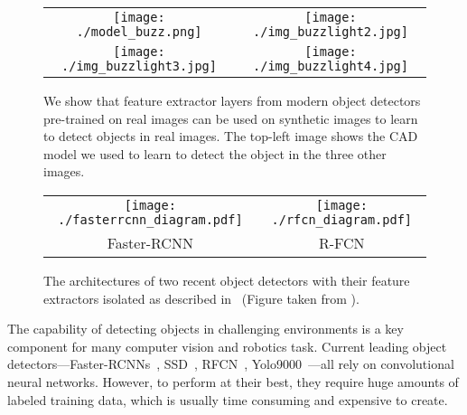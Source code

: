 \documentclass[10pt,twocolumn,letterpaper]{article}
\newcommand{\comment}[1]{}
\newcommand{\imgspace}[0]{\hspace{-0.3cm}}
\begin{document}
\begin{figure}[ht]
\begin{center}
\begin{tabular}{cc}
\texttt{[image: ./model\_buzz.png]} & \imgspace
\texttt{[image: ./img\_buzzlight2.jpg]} \\
\texttt{[image: ./img\_buzzlight3.jpg]} & \imgspace
\texttt{[image: ./img\_buzzlight4.jpg]} \\
\end{tabular}
\end{center}
\caption{\label{fig:overview}
We show that feature extractor layers from modern object detectors pre-trained on real images 
can be used on synthetic images to learn to detect objects
in real images. The top-left image shows the CAD model we used to
learn to detect the object in the three other images. }
\comment{
In this  paper,  we show  how a  simple
  trick enables  learning deep object detectors  purely from synthetic
  data.  In the  upper left image we  see one of the 3D  CAD models we
  learn from and  the remaining images show the  object detected under
  various  poses in  a heavily  cluttered environments.  We achieve  a
  detection performance  up to  $95\%$ of a  detector trained  on real
  data.}
\end{figure}

\begin{figure*}[ht]
\begin{center}
\begin{tabular}{cc}
\texttt{[image: ./fasterrcnn\_diagram.pdf]} &
\texttt{[image: ./rfcn\_diagram.pdf]} \\
Faster-RCNN &
R-FCN \\
\end{tabular}
\end{center}
\caption{\label{fig:metaarchitecture} The architectures of two recent object
  detectors with their feature extractors isolated as described
  in~\cite{Huang17} (Figure taken from \cite{Huang17}).}
\end{figure*}

 
The  capability  of detecting  objects  in  challenging  environments is  a  key
component for  many computer vision  and robotics task.  Current  leading object
detectors---Faster-RCNNs~\cite{faster_rcnn},  SSD~\cite{ssd},  RFCN~\cite{rfcn},
Yolo9000~\cite{redmon16}---all rely  on convolutional neural  networks.  However,
to perform  at their best, they  require huge amounts of  labeled training data,
which is usually time consuming and expensive to create.
\end{document}
